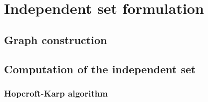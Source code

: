 \chapter{Independent set formulation}
\section{Graph construction}
\section{Computation of the independent set}
\subsection{Hopcroft-Karp algorithm}

